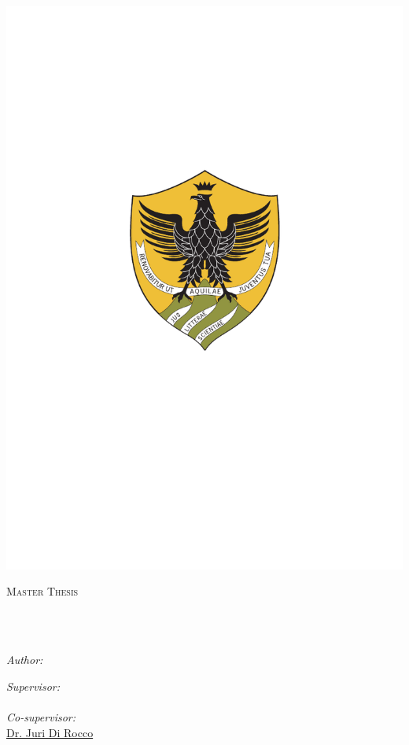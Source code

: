 \documentclass[
11pt, %
english, %
singlespacing, %
headsepline, %
]{MastersDoctoralThesis} %
\author{Claudio \textsc{Di Sipio}} %
\begin{document}
	
	\frontmatter %
	
	\pagestyle{plain} %
	
	
	\begin{titlepage}
		\begin{center}
			
			\vspace*{.06\textheight}
			
			\includegraphics[width=0.2\linewidth]{images/univaq}
			
			{\scshape\LARGE \univname\par}\vspace{1.5cm} %
			\textsc{\Large Master Thesis}\\[0.5cm] %
			
			\HRule \\[0.4cm] %
			{\huge \bfseries \ttitle\par}\vspace{0.4cm} %
			\HRule \\[1.5cm] %
			
			\begin{minipage}[t]{0.4\textwidth}
				\begin{flushleft} \large
					\emph{Author:}\\
					\href{http://www.johnsmith.com}{\authorname} %
				\end{flushleft}
			\end{minipage}
			\begin{minipage}[t]{0.4\textwidth}
				\begin{flushright} \large
					\emph{Supervisor:} \\
					\href{http://www.jamessmith.com}{\supname} \\%
					\emph{Co-supervisor:}\\
					\href{http://www.jamessmith.com}{Dr. Juri Di Rocco} %
				\end{flushright}
			\end{minipage}\\[2.5cm]
			

\end{center}
\end{titlepage}
\end{document}
